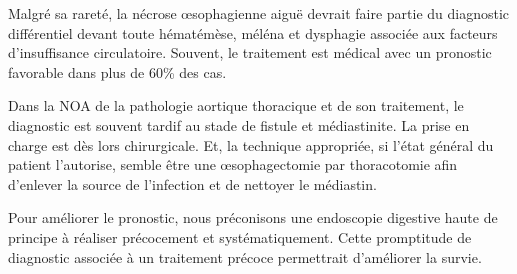 \documentclass[./discussion.tex]{subfiles}
\begin{document}
Malgré sa rareté, la nécrose œsophagienne aiguë devrait faire partie du diagnostic différentiel devant toute hématémèse, méléna et dysphagie associée aux facteurs d’insuffisance circulatoire. Souvent, le traitement est médical avec un pronostic favorable dans plus de 60\% des cas.

Dans la NOA de la pathologie aortique thoracique et de son traitement, le diagnostic est souvent tardif au stade de fistule et médiastinite. La prise en charge est dès lors chirurgicale. Et, la technique appropriée, si l’état général du patient l’autorise, semble être une œsophagectomie par thoracotomie afin d’enlever la source de l’infection et de nettoyer le médiastin.

Pour améliorer le pronostic, nous préconisons une endoscopie digestive haute de principe à réaliser précocement et systématiquement. Cette promptitude de diagnostic associée à un traitement précoce permettrait d’améliorer la survie.
\end{document}
